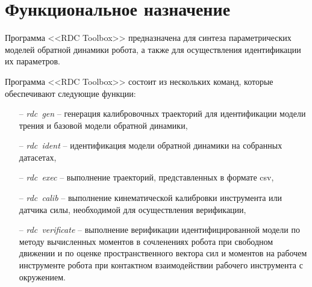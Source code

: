 \newpage
\section{Функциональное назначение}

Программа <<RDC Toolbox>> предназначена для синтеза параметрических моделей обратной динамики робота, а также для осуществления идентификации их параметров.

Программа <<RDC Toolbox>> состоит из нескольких команд, которые обеспечивают следующие функции:
\begin{enumerate}
    \item[--] \textit{rdc~gen} -- генерация калибровочных траекторий для идентификации модели трения и базовой модели обратной динамики,
    \item[--] \textit{rdc~ident} -- идентификация модели обратной динамики на собранных датасетах,
    \item[--] \textit{rdc~exec} -- выполнение траекторий, представленных в формате csv,
    \item[--] \textit{rdc~calib} -- выполнение кинематической калибровки инструмента или датчика силы, необходимой для осуществления верификации,
    \item[--] \textit{rdc~verificate} -- выполнение верификации идентифицированной модели по методу вычисленных моментов в сочленениях робота при свободном движении и по оценке пространственного вектора сил и моментов на рабочем инструменте робота при контактном взаимодействии рабочего инструмента с окружением.
\end{enumerate}
